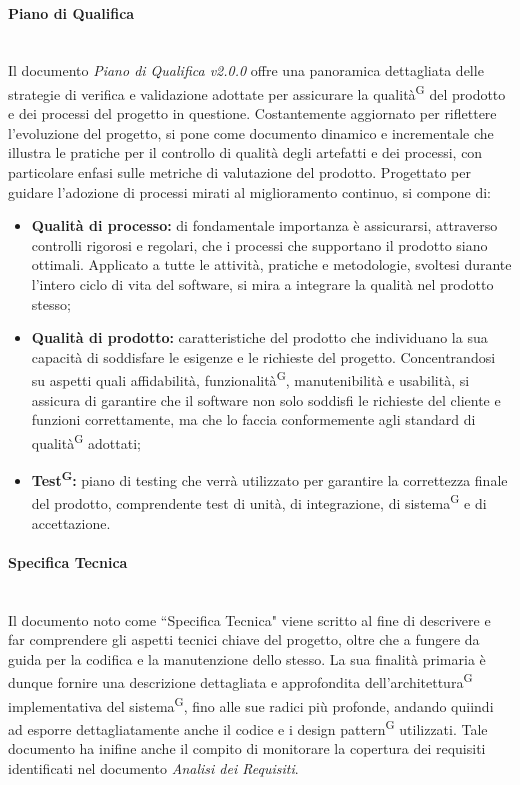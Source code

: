 \documentclass[8pt]{article}
\newcommand{\glossterm}[1]{#1\textsuperscript{G}} %
\newcommand{\subsubsubsection}[1]{\paragraph{#1}\mbox{}\\}
\begin{document}
\subsubsubsection{Piano di Qualifica}
Il documento \textit{Piano di Qualifica v2.0.0} offre una panoramica dettagliata delle strategie di verifica e validazione adottate per assicurare la \glossterm{qualità} del prodotto e dei processi del progetto in questione. Costantemente aggiornato per riflettere l'evoluzione del progetto, si pone come documento dinamico e incrementale che illustra le pratiche per il controllo di qualità degli artefatti e dei processi, con particolare enfasi sulle metriche di valutazione del prodotto. Progettato per guidare l'adozione di processi mirati al miglioramento continuo, si compone di:
\begin{itemize}
    \item \textbf{Qualità di processo:} di fondamentale importanza è assicurarsi, attraverso controlli rigorosi e regolari, che i processi che supportano il prodotto siano ottimali. Applicato a tutte le attività, pratiche e metodologie, svoltesi durante l'intero ciclo di vita del software, si mira a integrare la qualità nel prodotto stesso;
    \item \textbf{Qualità di prodotto:} caratteristiche del prodotto che individuano la sua capacità di soddisfare le esigenze e le richieste del progetto. Concentrandosi su aspetti quali affidabilità, \glossterm{funzionalità}, manutenibilità e usabilità, si assicura di garantire che il software non solo soddisfi le richieste del cliente e funzioni correttamente, ma che lo faccia conformemente agli standard di \glossterm{qualità} adottati;
    \item \textbf{\glossterm{Test}:} piano di testing che verrà utilizzato per garantire la correttezza finale del prodotto, comprendente test di unità, di integrazione, di \glossterm{sistema} e di accettazione.
\end{itemize} 

\subsubsubsection{Specifica Tecnica} \label{sec:specifica_tecnica}
Il documento noto come ``Specifica Tecnica" viene scritto al fine di descrivere e far comprendere gli aspetti
tecnici chiave del progetto, oltre che a fungere da guida per la codifica e la manutenzione dello stesso. La sua finalità primaria è dunque fornire una descrizione
dettagliata e approfondita dell'\glossterm{architettura} implementativa del \glossterm{sistema}, fino alle sue radici più profonde, andando quiindi ad esporre dettagliatamente anche il codice e i \glossterm{design pattern} utilizzati. 
Tale documento ha inifine anche il compito di monitorare la copertura dei requisiti identificati nel documento \textit{Analisi dei Requisiti}.
\end{document}
